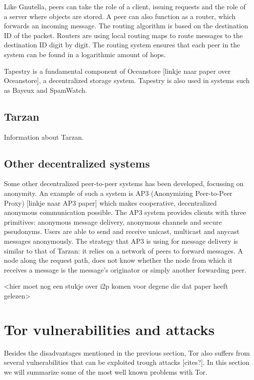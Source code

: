 \documentclass[journal]{IEEEtran}
\begin{document}
			Like Gnutella, peers can take the role of a client, issuing requests and the role of a server where objects are stored. A peer can also function as a router, which forwards an incoming message. The routing algorithm is based on the destination ID of the packet. Routers are using local routing maps to route messages to the destination ID digit by digit. The routing system ensures that each peer in the system can be found in a logarithmic amount of hops.
		
			Tapestry is a fundamental component of Oceanstore [linkje naar paper over Oceanstore], a decentralized storage system. Tapestry is also used in systems such as Bayeux and SpamWatch.
		
		\subsection{Tarzan}
			Information about Tarzan.
		
		\subsection{Other decentralized systems}
			Some other decentralized peer-to-peer systems has been developed, focussing on anonymity. An example of such a system is AP3 (Anonymizing Peer-to-Peer Proxy) [linkje naar AP3 paper] which makes cooperative, decentralized anonymous communication possible. The AP3 system provides clients with three primitives: anonymous message delivery, anonymous channels and secure pseudonyms. Users are able to send and receive unicast, multicast and anycast messages anonymously. The strategy that AP3 is using for message delivery is similar to that of Tarzan: it relies on a network of peers to forward messages. A node along the request path, does not know whether the node from which it receives a message is the message's originator or simply another forwarding peer.
			
			<hier moet nog een stukje over i2p komen voor degene die dat paper heeft gelezen>
		
	\section{Tor vulnerabilities and attacks}
		Besides the disadvantages mentioned in the previous section, Tor also suffers from several vulnerabilities that can be exploited trough attacks [cites?]. In this section we will summarize some of the most well known problems with Tor.
\end{document}
